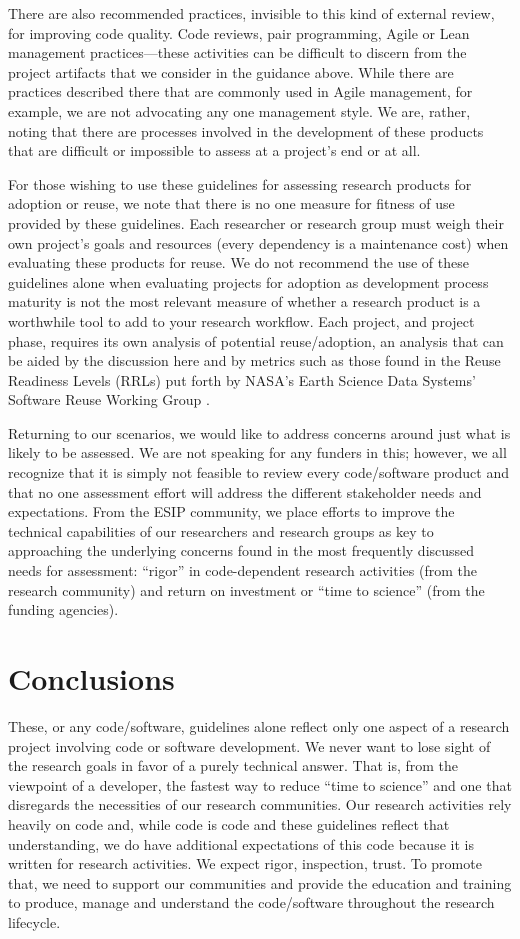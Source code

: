 \documentclass{article}
\begin{document}
There are also recommended practices, invisible to this kind of external review, for improving code quality. Code reviews, pair programming, Agile or Lean management practices—these activities can be difficult to discern from the project artifacts that we consider in the guidance above. While there are practices described there that are commonly used in Agile management, for example, we are not advocating any one management style. We are, rather, noting that there are processes involved in the development of these products that are difficult or impossible to assess at a project’s end or at all. 
 
For those wishing to use these guidelines for assessing research products for adoption or reuse, we note that there is no one measure for fitness of use provided by these guidelines. Each researcher or research group must weigh their own project’s goals and resources (every dependency is a maintenance cost) when evaluating these products for reuse. We do not recommend the use of these guidelines alone when evaluating projects for adoption as development process maturity is not the most relevant measure of whether a research product is a worthwhile tool to add to your research workflow. Each project, and project phase, requires its own analysis of potential reuse/adoption, an analysis that can be aided by the discussion here and by metrics such as those found in the Reuse Readiness Levels (RRLs) put forth by NASA’s Earth Science Data Systems’ Software Reuse Working Group \autocite{marshall_reuse_2010}.
 
Returning to our scenarios, we would like to address concerns around just what is likely to be assessed. We are not speaking for any funders in this; however, we all recognize that it is simply not feasible to review every code/software product and that no one assessment effort will address the different stakeholder needs and expectations. From the ESIP community, we place efforts to improve the technical capabilities of our researchers and research groups as key to approaching the underlying concerns found in the most frequently discussed needs for assessment: “rigor” in code-dependent research activities (from the research community) and return on investment or “time to science” (from the funding agencies). 

\section{Conclusions}
These, or any code/software, guidelines alone reflect only one aspect of a research project involving code or software development. We never want to lose sight of the research goals in favor of a purely technical answer. That is, from the viewpoint of a developer, the fastest way to reduce “time to science” and one that disregards the necessities of our research communities. Our research activities rely heavily on code and, while code is code and these guidelines reflect that understanding, we do have additional expectations of this code because it is written for research activities. We expect rigor, inspection, trust. To promote that, we need to support our communities and provide the education and training to produce, manage and understand the code/software throughout the research lifecycle.
 
\end{document}
